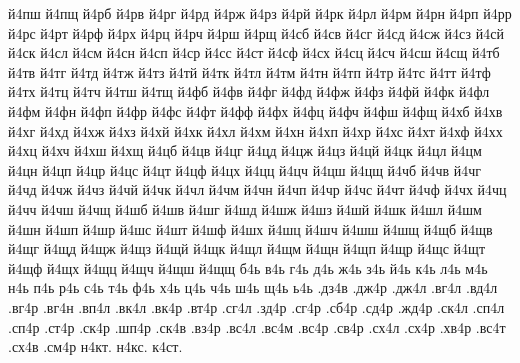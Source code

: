 {й4пш
й4пщ
й4рб
й4рв
й4рг
й4рд
й4рж
й4рз
й4рй
й4рк
й4рл
й4рм
й4рн
й4рп
й4рр
й4рс
й4рт
й4рф
й4рх
й4рц
й4рч
й4рш
й4рщ
й4сб
й4св
й4сг
й4сд
й4сж
й4сз
й4сй
й4ск
й4сл
й4см
й4сн
й4сп
й4ср
й4сс
й4ст
й4сф
й4сх
й4сц
й4сч
й4сш
й4сщ
й4тб
й4тв
й4тг
й4тд
й4тж
й4тз
й4тй
й4тк
й4тл
й4тм
й4тн
й4тп
й4тр
й4тс
й4тт
й4тф
й4тх
й4тц
й4тч
й4тш
й4тщ
й4фб
й4фв
й4фг
й4фд
й4фж
й4фз
й4фй
й4фк
й4фл
й4фм
й4фн
й4фп
й4фр
й4фс
й4фт
й4фф
й4фх
й4фц
й4фч
й4фш
й4фщ
й4хб
й4хв
й4хг
й4хд
й4хж
й4хз
й4хй
й4хк
й4хл
й4хм
й4хн
й4хп
й4хр
й4хс
й4хт
й4хф
й4хх
й4хц
й4хч
й4хш
й4хщ
й4цб
й4цв
й4цг
й4цд
й4цж
й4цз
й4цй
й4цк
й4цл
й4цм
й4цн
й4цп
й4цр
й4цс
й4цт
й4цф
й4цх
й4цц
й4цч
й4цш
й4цщ
й4чб
й4чв
й4чг
й4чд
й4чж
й4чз
й4чй
й4чк
й4чл
й4чм
й4чн
й4чп
й4чр
й4чс
й4чт
й4чф
й4чх
й4чц
й4чч
й4чш
й4чщ
й4шб
й4шв
й4шг
й4шд
й4шж
й4шз
й4шй
й4шк
й4шл
й4шм
й4шн
й4шп
й4шр
й4шс
й4шт
й4шф
й4шх
й4шц
й4шч
й4шш
й4шщ
й4щб
й4щв
й4щг
й4щд
й4щж
й4щз
й4щй
й4щк
й4щл
й4щм
й4щн
й4щп
й4щр
й4щс
й4щт
й4щф
й4щх
й4щц
й4щч
й4щш
й4щщ
б4ь
в4ь
г4ь
д4ь
ж4ь
з4ь
й4ь
к4ь
л4ь
м4ь
н4ь
п4ь
р4ь
с4ь
т4ь
ф4ь
х4ь
ц4ь
ч4ь
ш4ь
щ4ь
ь4ь
.дз4в
.дж4р
.дж4л
.вг4л
.вд4л
.вг4р
.вг4н
.вп4л
.вк4л
.вк4р
.вт4р
.сг4л
.зд4р
.сг4р
.сб4р
.сд4р
.жд4р
.ск4л
.сп4л
.сп4р
.ст4р
.ск4р
.шп4р
.ск4в
.вз4р
.вс4л
.вс4м
.вс4р
.св4р
.сх4л
.сх4р
.хв4р
.вс4т
.сх4в
.см4р
н4кт.
н4кс.
к4ст.
}

